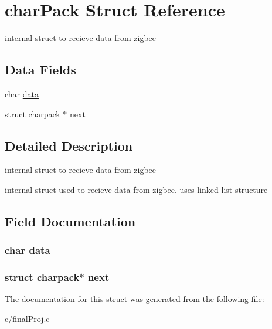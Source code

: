 \hypertarget{structchar_pack}{
\section{charPack Struct Reference}
\label{structchar_pack}
}


internal struct to recieve data from zigbee  


\subsection*{Data Fields}
\begin{DoxyCompactItemize}
\item 
char \hyperlink{structchar_pack_a0f11fc08c1ec2c8146ddd0d5b8fe8355}{data}
\item 
struct charpack $\ast$ \hyperlink{structchar_pack_aaec9ccf3cb540c8f25f96efd89763edd}{next}
\end{DoxyCompactItemize}


\subsection{Detailed Description}
internal struct to recieve data from zigbee 

internal struct used to recieve data from zigbee. uses linked list structure 

\subsection{Field Documentation}
\hypertarget{structchar_pack_a0f11fc08c1ec2c8146ddd0d5b8fe8355}{
\subsubsection[{data}]{\setlength{\rightskip}{0pt plus 5cm}char {\bf data}}}
\label{structchar_pack_a0f11fc08c1ec2c8146ddd0d5b8fe8355}
\hypertarget{structchar_pack_aaec9ccf3cb540c8f25f96efd89763edd}{
\subsubsection[{next}]{\setlength{\rightskip}{0pt plus 5cm}struct charpack$\ast$ {\bf next}}}
\label{structchar_pack_aaec9ccf3cb540c8f25f96efd89763edd}


The documentation for this struct was generated from the following file:\begin{DoxyCompactItemize}
\item 
c/\hyperlink{final_proj_8c}{finalProj.c}\end{DoxyCompactItemize}

